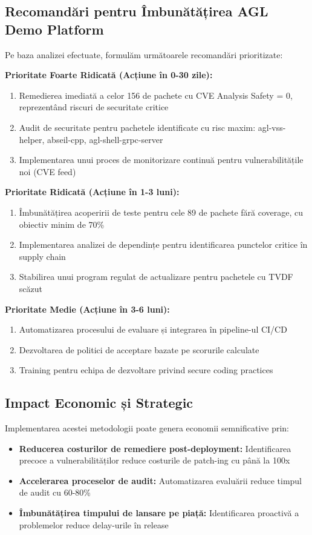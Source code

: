 \documentclass[12pt,a4paper]{article}
\begin{document}
\subsection{Recomandări pentru Îmbunătățirea AGL Demo Platform}

Pe baza analizei efectuate, formulăm următoarele recomandări prioritizate:

\textbf{Prioritate Foarte Ridicată (Acțiune în 0-30 zile):}
\begin{enumerate}
\item Remedierea imediată a celor 156 de pachete cu CVE Analysis Safety = 0, reprezentând riscuri de securitate critice
\item Audit de securitate pentru pachetele identificate cu risc maxim: agl-vss-helper, abseil-cpp, agl-shell-grpc-server
\item Implementarea unui proces de monitorizare continuă pentru vulnerabilitățile noi (CVE feed)
\end{enumerate}

\textbf{Prioritate Ridicată (Acțiune în 1-3 luni):}
\begin{enumerate}
\item Îmbunătățirea acoperirii de teste pentru cele 89 de pachete fără coverage, cu obiectiv minim de 70\%
\item Implementarea analizei de dependințe pentru identificarea punctelor critice în supply chain
\item Stabilirea unui program regulat de actualizare pentru pachetele cu TVDF scăzut
\end{enumerate}

\textbf{Prioritate Medie (Acțiune în 3-6 luni):}
\begin{enumerate}
\item Automatizarea procesului de evaluare și integrarea în pipeline-ul CI/CD
\item Dezvoltarea de politici de acceptare bazate pe scorurile calculate
\item Training pentru echipa de dezvoltare privind secure coding practices
\end{enumerate}

\subsection{Impact Economic și Strategic}

Implementarea acestei metodologii poate genera economii semnificative prin:

\begin{itemize}
\item \textbf{Reducerea costurilor de remediere post-deployment:} Identificarea precoce a vulnerabilităților reduce costurile de patch-ing cu până la 100x
\item \textbf{Accelerarea proceselor de audit:} Automatizarea evaluării reduce timpul de audit cu 60-80\%
\item \textbf{Îmbunătățirea timpului de lansare pe piață:} Identificarea proactivă a problemelor reduce delay-urile în release
\end{itemize}
\end{document}
